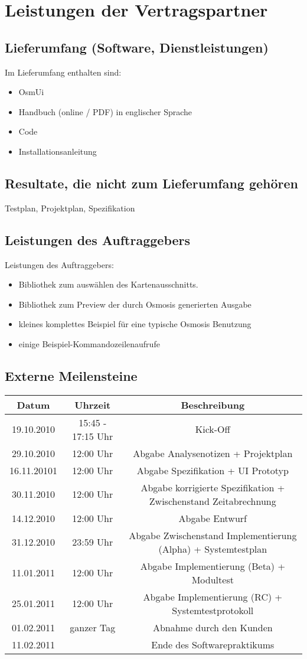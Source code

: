 \documentclass[a4paper,10pt]{scrartcl}
\begin{document}
\section{Leistungen der Vertragspartner}
\subsection{Lieferumfang (Software, Dienstleistungen)}
Im Lieferumfang enthalten sind:
\begin{itemize}
\item OsmUi
\item Handbuch (online / PDF) in englischer Sprache
\item Code
\item Installationsanleitung
\end{itemize}
\subsection{Resultate, die nicht zum Lieferumfang gehören}
Testplan, Projektplan, Spezifikation
\subsection{Leistungen des Auftraggebers}
Leistungen des Auftraggebers:
\begin{itemize}
\item Bibliothek zum auswählen des Kartenausschnitts.
\item Bibliothek zum Preview der durch Osmosis generierten Ausgabe
\item kleines komplettes Beispiel für eine typische Osmosis Benutzung
\item einige Beispiel-Kommandozeilenaufrufe
\end{itemize}

\subsection{Externe Meilensteine}
\begin{tabular}{|c|c|c|}
\hline Datum & Uhrzeit & Beschreibung\\ 
\hline 19.10.2010 & 15:45 - 17:15 Uhr & Kick-Off\\ 
\hline 29.10.2010 & 12:00 Uhr & Abgabe Analysenotizen + Projektplan\\ 
\hline 16.11.20101 & 12:00 Uhr & Abgabe Spezifikation + UI Prototyp\\ 
\hline 30.11.2010 & 12:00 Uhr & Abgabe korrigierte Spezifikation + Zwischenstand Zeitabrechnung\\ 
\hline 14.12.2010 & 12:00 Uhr & Abgabe Entwurf\\ 
\hline 31.12.2010 & 23:59 Uhr & Abgabe Zwischenstand Implementierung (Alpha) + Systemtestplan\\ 
\hline 11.01.2011 & 12:00 Uhr & Abgabe Implementierung (Beta) + Modultest\\ 
\hline 25.01.2011 & 12:00 Uhr & Abgabe Implementierung (RC) + Systemtestprotokoll\\ 
\hline 01.02.2011 & ganzer Tag & Abnahme durch den Kunden\\ 
\hline 11.02.2011 & & Ende des Softwarepraktikums\\ 
\hline 
\end{tabular} 
\end{document}
